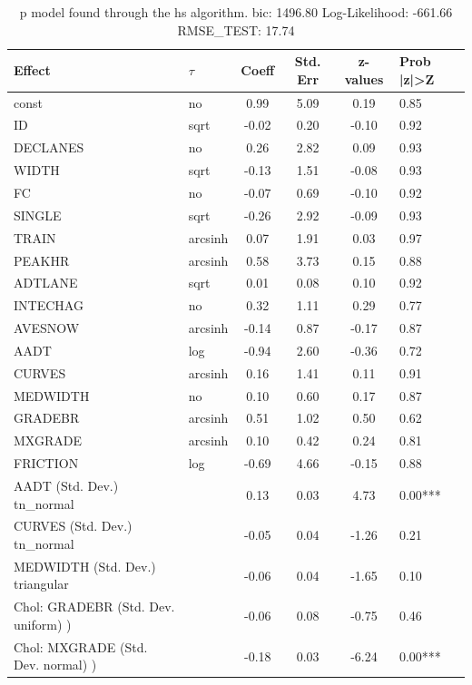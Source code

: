 \begin{table}
	\caption{p model found through the hs algorithm. bic: 1496.80 Log-Likelihood: -661.66 RMSE_TEST: 17.74}
	\begin{center}
		\begin{tabular}{|l|l|c|c|c|l|}
			\hline
			Effect & $\tau$ & Coeff & Std. Err & z-values & Prob |z|>Z \\
			\hline
			const & no & 0.99 & 5.09 & 0.19 & 0.85 \\
			\hline
			ID & sqrt & -0.02 & 0.20 & -0.10 & 0.92 \\
			\hline
			DECLANES & no & 0.26 & 2.82 & 0.09 & 0.93 \\
			\hline
			WIDTH & sqrt & -0.13 & 1.51 & -0.08 & 0.93 \\
			\hline
			FC & no & -0.07 & 0.69 & -0.10 & 0.92 \\
			\hline
			SINGLE & sqrt & -0.26 & 2.92 & -0.09 & 0.93 \\
			\hline
			TRAIN & arcsinh & 0.07 & 1.91 & 0.03 & 0.97 \\
			\hline
			PEAKHR & arcsinh & 0.58 & 3.73 & 0.15 & 0.88 \\
			\hline
			ADTLANE & sqrt & 0.01 & 0.08 & 0.10 & 0.92 \\
			\hline
			INTECHAG & no & 0.32 & 1.11 & 0.29 & 0.77 \\
			\hline
			AVESNOW & arcsinh & -0.14 & 0.87 & -0.17 & 0.87 \\
			\hline
			AADT & log & -0.94 & 2.60 & -0.36 & 0.72 \\
			\hline
			CURVES & arcsinh & 0.16 & 1.41 & 0.11 & 0.91 \\
			\hline
			MEDWIDTH & no & 0.10 & 0.60 & 0.17 & 0.87 \\
			\hline
			GRADEBR & arcsinh & 0.51 & 1.02 & 0.50 & 0.62 \\
			\hline
			MXGRADE & arcsinh & 0.10 & 0.42 & 0.24 & 0.81 \\
			\hline
			FRICTION & log & -0.69 & 4.66 & -0.15 & 0.88 \\
			\hline
			AADT (Std. Dev.) tn_normal &  & 0.13 & 0.03 & 4.73 & 0.00*** \\
			\hline
			CURVES (Std. Dev.) tn_normal &  & -0.05 & 0.04 & -1.26 & 0.21 \\
			\hline
			MEDWIDTH (Std. Dev.) triangular &  & -0.06 & 0.04 & -1.65 & 0.10 \\
			\hline
			 Chol: GRADEBR (Std. Dev. uniform) ) &  & -0.06 & 0.08 & -0.75 & 0.46 \\
			\hline
			 Chol: MXGRADE (Std. Dev. normal) ) &  & -0.18 & 0.03 & -6.24 & 0.00*** \\

\end{tabular}
\end{center}
\end{table}
